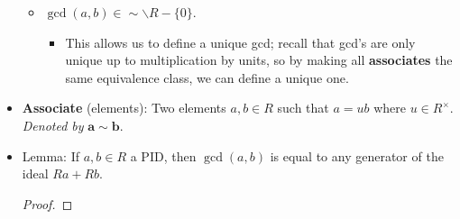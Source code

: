 \documentclass[../notes.tex]{subfiles}
\begin{document}
\begin{itemize}
\begin{itemize}
        \item $\gcd(a,b)\in\sim\backslash R-\{0\}$.
        \begin{itemize}
            \item This allows us to define a unique gcd; recall that gcd's are only unique up to multiplication by units, so by making all \textbf{associates} the same equivalence class, we can define a unique one.
        \end{itemize}
    \end{itemize}
    \item \textbf{Associate} (elements): Two elements $a,b\in R$ such that $a=ub$ where $u\in R^\times$. \emph{Denoted by} $\bm{a\sim b}$.
    \item Lemma: If $a,b\in R$ a PID, then $\gcd(a,b)$ is equal to any generator of the ideal $Ra+Rb$.
    \begin{proof}


\end{proof}
\end{itemize}
\end{document}

